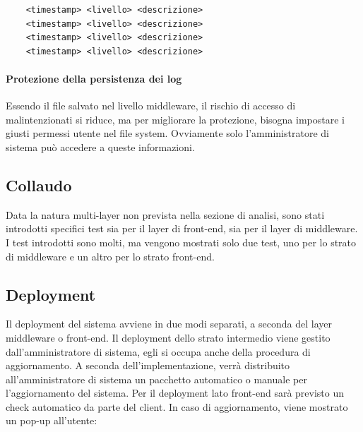 \documentclass[a4paper]{article}
\begin{document}
\begin{lstlisting}
    <timestamp> <livello> <descrizione>
    <timestamp> <livello> <descrizione>
    <timestamp> <livello> <descrizione>
    <timestamp> <livello> <descrizione>
\end{lstlisting}

\paragraph{Protezione della persistenza dei log} Essendo il file salvato nel livello middleware, il rischio di accesso di malintenzionati si riduce, ma per migliorare la protezione, bisogna impostare i giusti permessi utente nel file system. Ovviamente solo l'amministratore di sistema può accedere a queste informazioni.

\newpage

\subsection{Collaudo}

Data la natura multi-layer non prevista nella sezione di analisi, sono stati introdotti specifici test sia per il layer di front-end, sia per il layer di middleware. I test introdotti sono molti, ma vengono mostrati solo due test, uno per lo strato di middleware e un altro per lo strato front-end.




\newpage

\subsection{Deployment}

Il deployment del sistema avviene in due modi separati, a seconda del layer middleware o front-end. Il deployment dello strato intermedio viene gestito dall'amministratore di sistema, egli si occupa anche della procedura di aggiornamento. A seconda dell'implementazione, verrà distribuito all'amministratore di sistema un pacchetto automatico o manuale per l'aggiornamento del sistema. Per il deployment lato front-end sarà previsto un check automatico da parte del client. In caso di aggiornamento, viene mostrato un pop-up all'utente:
\end{document}
